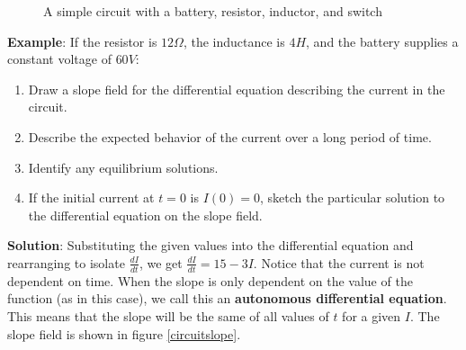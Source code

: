 \begin{figure}[htbp]
\centering
    \caption{A simple circuit with a battery, resistor, inductor, and switch}
    \label{circuit}
\end{figure}

\textbf{Example}: If the resistor is $12 \Omega$, the inductance is $4H$, and 
the battery supplies a constant voltage of $60V$:
\begin{enumerate}
\item Draw a slope field for the differential equation describing the current 
in the circuit.
\item Describe the expected behavior of the current over a long period of time.
\item Identify any equilibrium solutions.
\item If the initial current at $t = 0$ is $I(0) = 0$, sketch the particular 
solution to the differential equation on the slope field. 
\end{enumerate}

\textbf{Solution}: Substituting the given values into the differential 
equation and rearranging to isolate $\frac{dI}{dt}$, we get $\frac{dI}{dt} = 
15 - 3I$. Notice that the current is not dependent on time. When the slope is 
only dependent on the value of the function (as in this case), we call this an 
\textbf{autonomous differential equation}.  This means that the slope will be the same of all values of $t$ for 
a given $I$. The slope field is shown in figure \ref{circuitslope}. 

